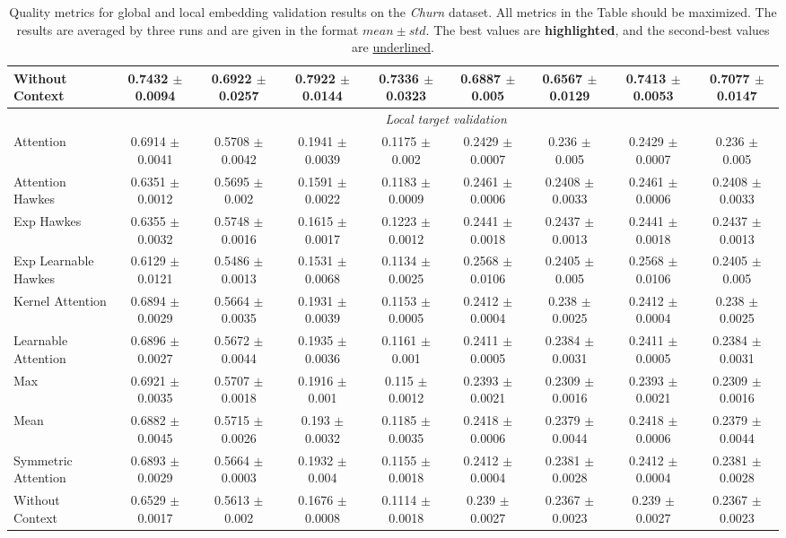 \begin{table*}[ht]
\begin{tabular}{|l|c|c|c|c|c|c|c|c|}
Without Context & 0.7432 $\pm$ 0.0094 & 0.6922 $\pm$ 0.0257 & 0.7922 $\pm$ 0.0144 & 0.7336 $\pm$ 0.0323 & 0.6887 $\pm$ 0.005 & 0.6567 $\pm$ 0.0129 & 0.7413 $\pm$ 0.0053 & 0.7077 $\pm$ 0.0147 \\
\hline
 & \multicolumn{8}{c|}{\textit{Local target validation}}\\
\hline
Attention & 0.6914 $\pm$ 0.0041 & 0.5708 $\pm$ 0.0042 & 0.1941 $\pm$ 0.0039 & 0.1175 $\pm$ 0.002 & 0.2429 $\pm$ 0.0007 & 0.236 $\pm$ 0.005 & 0.2429 $\pm$ 0.0007 & 0.236 $\pm$ 0.005 \\
\hdashline
Attention Hawkes & 0.6351 $\pm$ 0.0012 & 0.5695 $\pm$ 0.002 & 0.1591 $\pm$ 0.0022 & 0.1183 $\pm$ 0.0009 & 0.2461 $\pm$ 0.0006 & 0.2408 $\pm$ 0.0033 & 0.2461 $\pm$ 0.0006 & 0.2408 $\pm$ 0.0033 \\
Exp Hawkes & 0.6355 $\pm$ 0.0032 & 0.5748 $\pm$ 0.0016 & 0.1615 $\pm$ 0.0017 & 0.1223 $\pm$ 0.0012 & 0.2441 $\pm$ 0.0018 & 0.2437 $\pm$ 0.0013 & 0.2441 $\pm$ 0.0018 & 0.2437 $\pm$ 0.0013 \\
Exp Learnable Hawkes & 0.6129 $\pm$ 0.0121 & 0.5486 $\pm$ 0.0013 & 0.1531 $\pm$ 0.0068 & 0.1134 $\pm$ 0.0025 & 0.2568 $\pm$ 0.0106 & 0.2405 $\pm$ 0.005 & 0.2568 $\pm$ 0.0106 & 0.2405 $\pm$ 0.005 \\
Kernel Attention & 0.6894 $\pm$ 0.0029 & 0.5664 $\pm$ 0.0035 & 0.1931 $\pm$ 0.0039 & 0.1153 $\pm$ 0.0005 & 0.2412 $\pm$ 0.0004 & 0.238 $\pm$ 0.0025 & 0.2412 $\pm$ 0.0004 & 0.238 $\pm$ 0.0025 \\
Learnable Attention & 0.6896 $\pm$ 0.0027 & 0.5672 $\pm$ 0.0044 & 0.1935 $\pm$ 0.0036 & 0.1161 $\pm$ 0.001 & 0.2411 $\pm$ 0.0005 & 0.2384 $\pm$ 0.0031 & 0.2411 $\pm$ 0.0005 & 0.2384 $\pm$ 0.0031 \\
Max & 0.6921 $\pm$ 0.0035 & 0.5707 $\pm$ 0.0018 & 0.1916 $\pm$ 0.001 & 0.115 $\pm$ 0.0012 & 0.2393 $\pm$ 0.0021 & 0.2309 $\pm$ 0.0016 & 0.2393 $\pm$ 0.0021 & 0.2309 $\pm$ 0.0016 \\
Mean & 0.6882 $\pm$ 0.0045 & 0.5715 $\pm$ 0.0026 & 0.193 $\pm$ 0.0032 & 0.1185 $\pm$ 0.0035 & 0.2418 $\pm$ 0.0006 & 0.2379 $\pm$ 0.0044 & 0.2418 $\pm$ 0.0006 & 0.2379 $\pm$ 0.0044 \\
Symmetric Attention & 0.6893 $\pm$ 0.0029 & 0.5664 $\pm$ 0.0003 & 0.1932 $\pm$ 0.004 & 0.1155 $\pm$ 0.0018 & 0.2412 $\pm$ 0.0004 & 0.2381 $\pm$ 0.0028 & 0.2412 $\pm$ 0.0004 & 0.2381 $\pm$ 0.0028 \\
Without Context & 0.6529 $\pm$ 0.0017 & 0.5613 $\pm$ 0.002 & 0.1676 $\pm$ 0.0008 & 0.1114 $\pm$ 0.0018 & 0.239 $\pm$ 0.0027 & 0.2367 $\pm$ 0.0023 & 0.239 $\pm$ 0.0027 & 0.2367 $\pm$ 0.0023 \\
\hline
\end{tabular}
\caption{\linespread{1.5}\selectfont Quality metrics for global and local embedding validation results on the \textit{Churn} dataset. 
All metrics in the Table should be maximized. 
The results are averaged by three runs and are given in the format $mean \pm std$. 
The best values are \textbf{highlighted}, and the second-best values are \underline{underlined}.}
\label{tab:churn}
\end{table*}